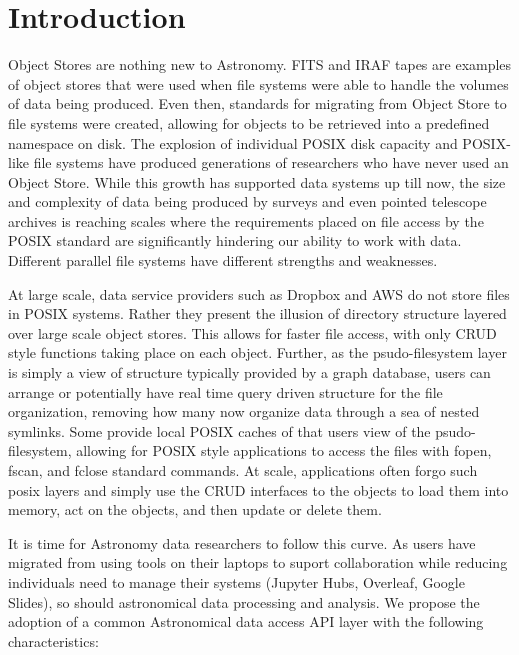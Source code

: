 \section{Introduction} \label{sec:intro}

Object Stores are nothing new to Astronomy.  FITS and IRAF tapes are examples
of object stores that were used when file systems were able to handle the volumes 
of data being produced. Even then, standards for migrating from Object Store to file 
systems were created, allowing for objects to be retrieved into a predefined namespace
on disk.  The explosion of individual POSIX disk capacity and POSIX-like file systems
have produced generations of researchers who have never used an Object Store. While
this growth has supported data systems up till now, the size and complexity of
data being produced by surveys and even pointed telescope archives is reaching
scales where the requirements placed on file access by the POSIX standard are 
significantly hindering our ability to work with data.  Different parallel file systems
have different strengths and weaknesses.  

At large scale, data service providers such as Dropbox and AWS do not store files
in POSIX systems.  Rather they present the illusion of directory structure layered over 
large scale object stores. This allows for faster file access, with only CRUD style
functions taking place on each object.  Further, as the psudo-filesystem layer is simply a 
view of structure typically provided by a graph database, users can arrange or potentially
have real time query driven structure for the file organization, removing how many now 
organize data through a sea of nested symlinks.
Some provide local POSIX caches of that users view of the 
psudo-filesystem, allowing for POSIX style applications to access the files with
fopen, fscan, and fclose standard commands. At scale, applications often forgo
such posix layers and simply use the CRUD interfaces to the objects to load them into 
memory, act on the objects, and then update or delete them. 

It is time for Astronomy data researchers to follow this curve. As users have migrated
from using tools on their laptops to suport collaboration while reducing
individuals need to manage their systems (Jupyter Hubs, Overleaf, Google Slides), 
so should astronomical data processing and analysis. We propose the adoption of
a common Astronomical data access API layer with the following characteristics:



